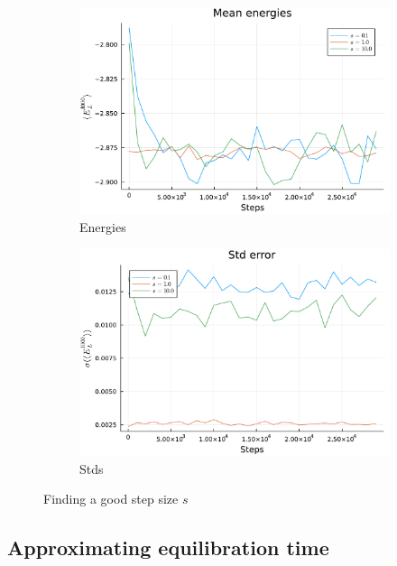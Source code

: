 \documentclass[
	a4paper, %
	10pt, %
]{CSUniSchoolLabReport}
\begin{document}
\begin{figure}[H]
	\begin{subfigure}[b]{0.49\textwidth}
		\centering
		\includegraphics[width=\textwidth]{../saves/task1a.energies.pdf}
		\caption{Energies}
	\end{subfigure}
	\hfill
	\begin{subfigure}[b]{0.49\textwidth}
		\centering
		\includegraphics[width=\textwidth]{../saves/task1a.stds.pdf}
		\caption{Stds}
	\end{subfigure}
	\caption{Finding a good step size $s$}
	\label{fig:find_a}
\end{figure}

\subsection{Approximating equilibration time}
\end{document}
